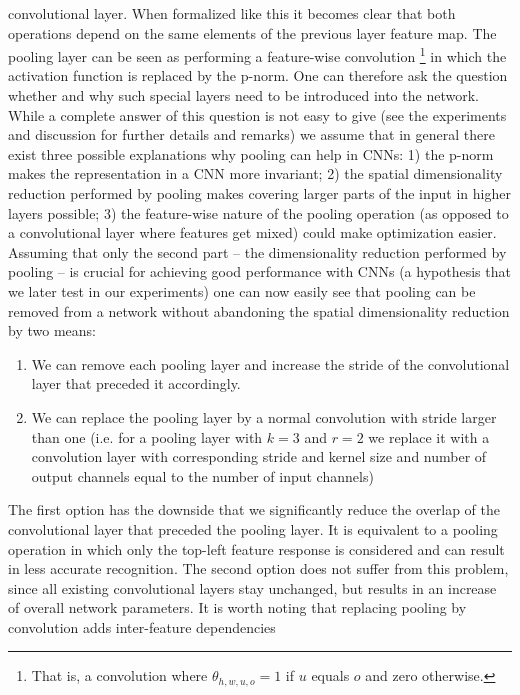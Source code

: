 \documentclass{article} %
\begin{document}
 convolutional layer. When
 formalized like this it becomes clear that both operations depend on the same elements of the 
 previous layer feature map. The pooling layer can be seen as performing a feature-wise convolution
\footnote{That is, a convolution where $\theta_{h,w,u,o} = 1$ if $u$
  equals $o$ and zero otherwise.} 
in which the
 activation function is replaced by the p-norm. 
 One can therefore ask the question whether and why such special layers need to be introduced into the network.
 While a complete answer of this question is not easy to give (see the
 experiments and discussion for further details and remarks) we assume that in general there exist three possible explanations why
pooling can help in CNNs: 1) the p-norm makes the representation in a CNN more invariant; 2) the spatial dimensionality
reduction performed by pooling makes covering larger 
parts of the input in higher layers possible; 3) the feature-wise
nature of the pooling operation (as opposed to a convolutional layer where features get mixed) could make optimization easier.
Assuming that only the second part -- the dimensionality reduction
performed by pooling -- is crucial for achieving good performance with
CNNs (a hypothesis that we later test in our experiments) one can now
easily see that pooling can be removed from a network without
abandoning the spatial dimensionality reduction by two means:
\begin{enumerate}
  \item We can remove each pooling layer and increase the stride of the
convolutional layer that preceded it accordingly.
  \item We can replace the pooling layer by a normal convolution with
    stride larger than one (i.e. for a pooling layer with $k=3$ and
    $r=2$ we replace it with a convolution layer with corresponding stride
    and kernel size and number of output channels equal to the number of input channels)
\end{enumerate}
The first option has the downside that we significantly reduce the
overlap of the convolutional layer that preceded the pooling layer. It
is equivalent to a pooling operation in which only the top-left
feature response is considered and can result in less accurate
recognition. The second option does not suffer from this problem,
since all existing convolutional layers stay unchanged, but results in
an increase of overall network parameters. It is worth noting that
replacing pooling by convolution adds inter-feature dependencies
\end{document}
